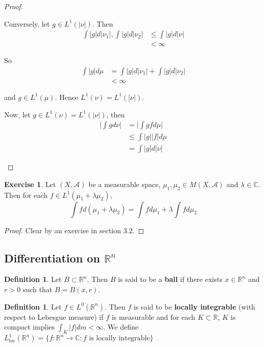\documentclass[12pt]{amsart}
\theoremstyle{definition}
\newtheorem{defn}[definition]{Definition}
\newtheorem{ex}[definition]{Exercise}
\newcommand{\lam}{\lambda}
\newcommand{\C}{\mathbb{C}}
\newcommand{\R}{\mathbb{R}}
\newcommand{\MA}{\mathcal{A}}
\newcommand{\lex}[1]{\label{ex:#1}}
\newcommand{\ld}[1]{\label{defn:#1}}
\begin{document}
\begin{proof}
\begin{enumerate}
			Conversely, let $g \in L^1(|\nu|)$. Then 
			\begin{align*}
				\int |g| d|\nu_1|, \int |g| d |\nu_2| 
				& \leq \int |g|d |\nu|\\
				& < \infty
			\end{align*}
			
			So 
			\begin{align*}
				\int |g| d\mu
				& =\int |g| d|\nu_1| + \int |g| d |\nu_2| \\
				& < \infty
			\end{align*}
			
			and $g \in L^1(\mu)$. Hence $L^1(\nu) = L^1(|\nu|)$. 
			
			Now, let $g \in L^1(\nu) = L^1(|\nu|)$, then 
			\begin{align*}
				\bigg| \int g d\nu \bigg| 
				&= \bigg| \int g f d\mu \bigg| \\
				& \leq \int |g||f|d\mu\\
				& = \int |g| d |\nu|
			\end{align*}
			
		\end{enumerate}
	\end{proof}


	\begin{ex} \lex{00000} 
	Let $(X, \MA)$ be a measurable space, $\mu_1, \mu_2 \in M(X, \MA)$ and $\lam \in \C$. Then for each $f \in L^1(\mu_1 + \lam \mu_2)$, $$\int f d(\mu_1 + \lam \mu_2) = \int f d \mu_1 + \lam \int f d\mu_2$$
	\end{ex}
	
	\begin{proof}
	Clear by an exercise in section $3.2$.
	\end{proof}
	
	
	
	
	
	
	
	\newpage
	\subsection{Differentiation on $\R^n$}
	
	\begin{defn} \ld{00000} 
		Let $B \subset \R^n$. Then $B$ is said to be a \textbf{ball} if there exists $x \in \R^n$ and $r > 0$ such that $B = B(x, r)$. 
	\end{defn}
	
	\begin{defn} \ld{00000} 
		Let $f \in L^0(\R^n)$. Then $f$ is said to be \textbf{locally integrable} (with respect to Lebesgue measure) if $f$ is measurable and for each $K \subset \R$, $K$ is compact implies $\int_K |f| dm < \infty$. We define $L^1_{\text{loc}}(\R^n) = \{f:\R^n \rightarrow \C: f \text{ is locally integrable}\}$
	\end{defn}
	
\end{document}
